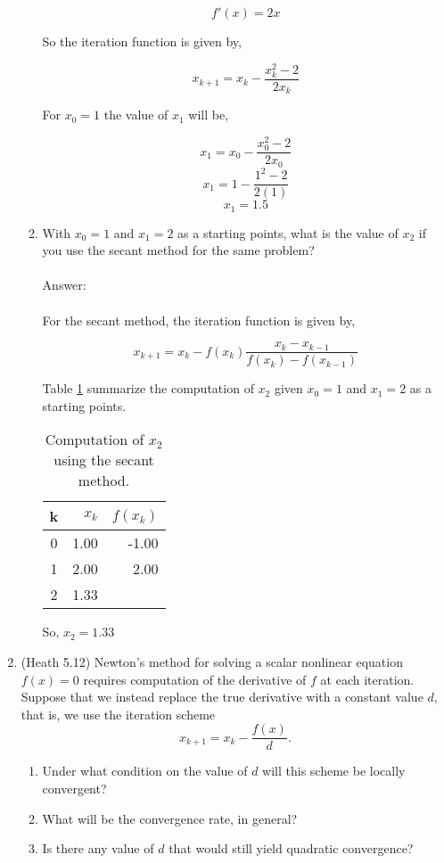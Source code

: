 \documentclass{article}
\begin{document}
\begin{enumerate}
\begin{enumerate}
$$f'(x)=2x$$

So the iteration function is given by,

$$x_{k+1}=x_k-\frac{x_k^2-2}{2x_k}$$

For $x_0=1$ the value of $x_1$ will be,

$$x_{1}=x_0-\frac{x_0^2-2}{2x_0}$$
$$x_{1}=1-\frac{1^2-2}{2(1)}$$
$$x_{1}=1.5$$
\item With $x_0 = 1$ and $x_1 = 2$ as a starting points, what is the value of $x_2$ if you use the secant method for the same problem?
\\
\\
Answer:\\
\\
For the secant method, the iteration function is given by,

$$x_{k+1}=x_k-f(x_k)\frac{x_k-x_{k-1}}{f(x_k)-f(x_{k-1})}$$

Table \ref{tab:q7a} summarize the computation of $x_2$ given $x_0 = 1$ and $x_1 = 2$ as a starting points.

\begin{table}[h]
 \centering
 \begin{center}
\begin{tabular}{crr}
\toprule
k & $x_k$ & $f(x_k)$\\
\midrule
0 & 1.00 & -1.00\\
1 & 2.00 &  2.00\\
2 & 1.33 & \\
\bottomrule
 \end{tabular}
 \end{center}
 \caption{Computation of $x_2$ using the secant method.}
 \label{tab:q7a}
\end{table}

So, $x_2=1.33$
 
\end{enumerate}

\item (Heath 5.12) Newton's method for solving a scalar nonlinear equation $f(x) = 0$ requires computation of the derivative of $f$ at each iteration.  Suppose that we instead replace
  the true derivative with a constant value $d$, that is, we use the iteration scheme
$$
x_{k+1} = x_k - \frac{f(x)}{d}.
$$
\begin{enumerate}
\item Under what condition on the value of $d$ will this scheme be locally convergent?
\item What will be the convergence rate, in general?
\item Is there any value of $d$ that would still yield quadratic convergence?
\end{enumerate}


\end{enumerate}
\end{document}
